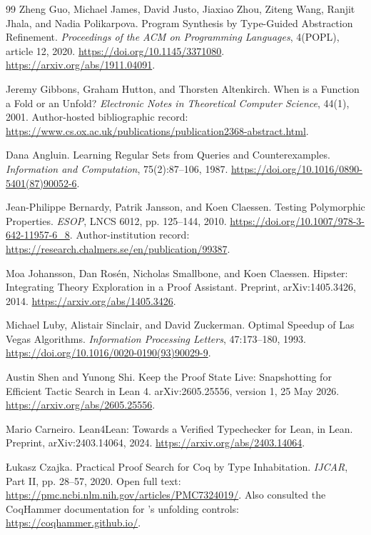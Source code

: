 \begin{thebibliography}{99}
 Zheng Guo, Michael James, David Justo, Jiaxiao Zhou, Ziteng Wang, Ranjit Jhala, and Nadia Polikarpova.
Program Synthesis by Type-Guided Abstraction Refinement.
\emph{Proceedings of the ACM on Programming Languages}, 4(POPL), article 12, 2020.
\url{https://doi.org/10.1145/3371080}.
\url{https://arxiv.org/abs/1911.04091}.

 Jeremy Gibbons, Graham Hutton, and Thorsten Altenkirch.
When is a Function a Fold or an Unfold?
\emph{Electronic Notes in Theoretical Computer Science}, 44(1), 2001.
Author-hosted bibliographic record:
\url{https://www.cs.ox.ac.uk/publications/publication2368-abstract.html}.

 Dana Angluin.
Learning Regular Sets from Queries and Counterexamples.
\emph{Information and Computation}, 75(2):87--106, 1987.
\url{https://doi.org/10.1016/0890-5401(87)90052-6}.

 Jean-Philippe Bernardy, Patrik Jansson, and Koen Claessen.
Testing Polymorphic Properties.
\emph{ESOP}, LNCS 6012, pp. 125--144, 2010.
\url{https://doi.org/10.1007/978-3-642-11957-6_8}.
Author-institution record:
\url{https://research.chalmers.se/en/publication/99387}.

 Moa Johansson, Dan Ros\'en, Nicholas Smallbone, and Koen Claessen.
Hipster: Integrating Theory Exploration in a Proof Assistant.
Preprint, arXiv:1405.3426, 2014.
\url{https://arxiv.org/abs/1405.3426}.

 Michael Luby, Alistair Sinclair, and David Zuckerman.
Optimal Speedup of Las Vegas Algorithms.
\emph{Information Processing Letters}, 47:173--180, 1993.
\url{https://doi.org/10.1016/0020-0190(93)90029-9}.

 Austin Shen and Yunong Shi.
Keep the Proof State Live: Snapshotting for Efficient Tactic Search in Lean 4.
arXiv:2605.25556, version 1, 25 May 2026.
\url{https://arxiv.org/abs/2605.25556}.

 Mario Carneiro.
Lean4Lean: Towards a Verified Typechecker for Lean, in Lean.
Preprint, arXiv:2403.14064, 2024.
\url{https://arxiv.org/abs/2403.14064}.

 \L ukasz Czajka.
Practical Proof Search for Coq by Type Inhabitation.
\emph{IJCAR}, Part II, pp. 28--57, 2020.
Open full text:
\url{https://pmc.ncbi.nlm.nih.gov/articles/PMC7324019/}.
Also consulted the CoqHammer documentation for 's unfolding controls:
\url{https://coqhammer.github.io/}.


\end{thebibliography}
